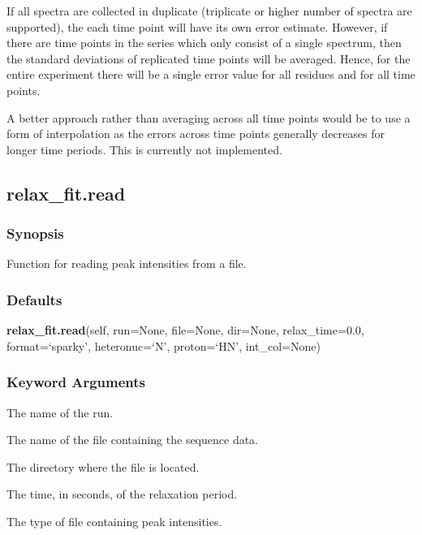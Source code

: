  If all spectra are collected in duplicate (triplicate or higher number of spectra are supported), the each time point will have its own error estimate.  However, if there are time points in the series which only consist of a single spectrum, then the standard deviations of replicated time points will be averaged.  Hence, for the entire experiment there will be a single error value for all residues and for all time points. 
  

 A better approach rather than averaging across all time points would be to use a form of interpolation as the errors across time points generally decreases for longer time periods. This is currently not implemented. 
  

  

 \newpage 

 \subsection{relax\_fit.read} 

  
 \subsubsection{Synopsis} 

 Function for reading peak intensities from a file. 
  

  
 \subsubsection{Defaults} 

 \textsf{\textbf{relax\_fit.read}(self, run=None, file=None, dir=None, relax\_time=0.0, format=`sparky', heteronuc=`N', proton=`HN', int\_col=None)} 

  
 \subsubsection{Keyword Arguments} 

   The name of the run.   

   The name of the file containing the sequence data.   

   The directory where the file is located.   

   The time, in seconds, of the relaxation period.   

   The type of file containing peak intensities.   

